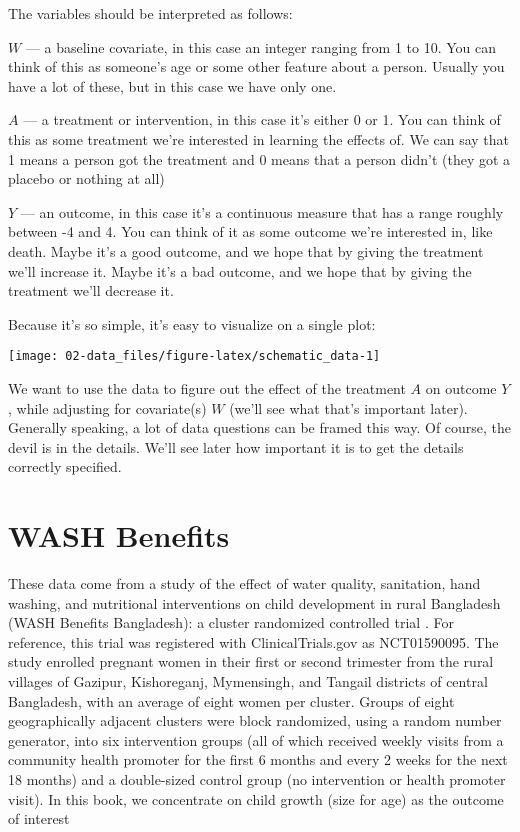 \documentclass[
  12pt, krantz2,
]{krantz}
\theoremstyle{definition}
\theoremstyle{definition}
\theoremstyle{definition}
\newcommand{\1}{\mathbbm{1}}
\begin{document}
The variables should be interpreted as follows:

\(W\) --- a baseline covariate, in this case an integer ranging from 1 to 10. You can think of this as someone's age or some other feature about a person. Usually you have a lot of these, but in this case we have only one.

\(A\) --- a treatment or intervention, in this case it's either 0 or 1. You can think of this as some treatment we're interested in learning the effects of. We can say that 1 means a person got the treatment and 0 means that a person didn't (they got a placebo or nothing at all)

\(Y\) --- an outcome, in this case it's a continuous measure that has a range roughly between -4 and 4. You can think of it as some outcome we're interested in, like death. Maybe it's a good outcome, and we hope that by giving the treatment we'll increase it. Maybe it's a bad outcome, and we hope that by giving the treatment we'll decrease it.

Because it's so simple, it's easy to visualize on a single plot:

\begin{center}\texttt{[image: 02-data\_files/figure-latex/schematic\_data-1]} \end{center}

We want to use the data to figure out the effect of the treatment \(A\) on outcome \(Y\), while adjusting for covariate(s) \(W\) (we'll see what that's important later). Generally speaking, a lot of data questions can be framed this way. Of course, the devil is in the details. We'll see later how important it is to get the details correctly specified.

\hypertarget{data-washb}{%
\section{WASH Benefits}\label{data-washb}}

These data come from a study of the effect of water quality, sanitation, hand washing, and nutritional interventions on child development in rural Bangladesh (WASH Benefits Bangladesh): a cluster randomized controlled trial \citep{luby2018effect}. For reference, this trial was registered with ClinicalTrials.gov as NCT01590095. The study enrolled pregnant women in their first or second trimester from the rural villages of Gazipur, Kishoreganj, Mymensingh, and Tangail districts of central Bangladesh, with an average of eight women per cluster. Groups of eight geographically adjacent clusters were block randomized, using a random number generator, into six intervention groups (all of which received weekly visits from a community health promoter for the first 6 months and every 2 weeks for the next 18 months) and a double-sized control group (no intervention or health promoter visit). In this book, we concentrate on child growth (size for age) as the outcome of interest
\end{document}
